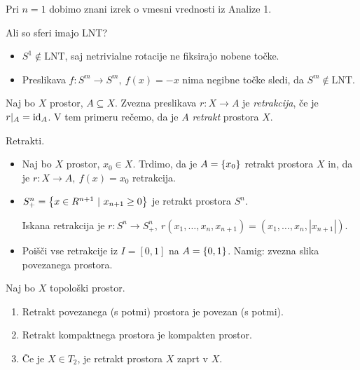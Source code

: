 \begin{zgled}
    Pri \(n=1\) dobimo znani izrek o vmesni vrednosti iz Analize 1.
\end{zgled}

\begin{primer}
    Ali so sferi imajo LNT?
    \begin{itemize}
        \item \(S^1 \notin \text{LNT} \), saj netrivialne rotacije ne fiksirajo nobene točke.
        \item Preslikava \(f: S^m \to S^m, \ f(x) = -x\) nima negibne točke sledi, da \(S^m \notin \text{LNT} \).
    \end{itemize}
\end{primer}

\begin{definicija}
    Naj bo \(X\) prostor, \(A \subseteq X\). Zvezna preslikava \(r: X \to A\) je \emph{retrakcija}, če je \(r|_A = \operatorname{id}_A\). V tem primeru rečemo, da je \(A\) \emph{retrakt} prostora \(X\).
\end{definicija}

\begin{primer}
    Retrakti.
    \begin{itemize}
        \item Naj bo \(X\) prostor, \(x_0 \in X\). Trdimo, da je \(A = \left\{x_0\right\}\) retrakt prostora \(X\) in, da je \(r: X \to A, \ f(x) = x_0\) retrakcija.
        \item \(S_+^n = \left\{x \in R^{n+1} \ | \ x_{n+1} \geq 0\right\}\) je retrakt prostora \(S^n\). 
        
        Iskana retrakcija je \(r: S^n \to S^n_+, \ r(x_1, \ldots, x_n,  x_{n+1}) = (x_1, \ldots, x_n, |x_{n+1}|)\). 
        \item Poišči vse retrakcije iz \(I = [0, 1]\) na \(A = \left\{0, 1\right\}\). Namig: zvezna slika povezanega prostora.
    \end{itemize}
\end{primer}

\begin{trditev}
    Naj bo \(X\) topološki prostor.
    \begin{enumerate}
        \item Retrakt povezanega (s potmi) prostora je povezan (s potmi).
        \item Retrakt kompaktnega prostora je kompakten prostor.
        \item Če je \(X \in T_2\), je retrakt prostora \(X\) zaprt v \(X\).
    \end{enumerate}
\end{trditev}

